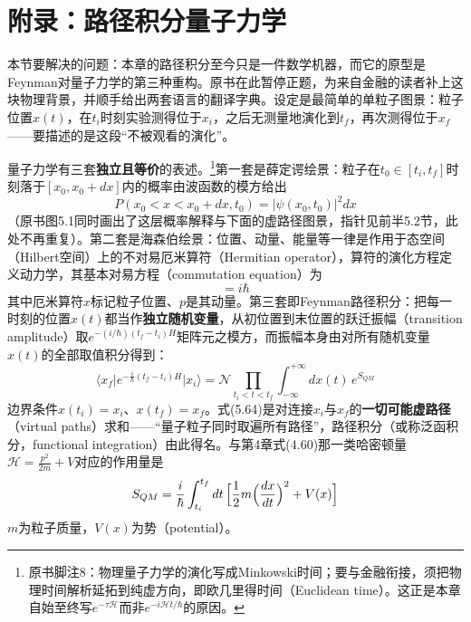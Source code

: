 \section{附录：路径积分量子力学}

本节要解决的问题：本章的路径积分至今只是一件数学机器，而它的原型是Feynman对量子力学的第三种重构。原书在此暂停正题，为来自金融的读者补上这块物理背景，并顺手给出两套语言的翻译字典。设定是最简单的单粒子图景：粒子位置$x(t)$，在$t_i$时刻实验测得位于$x_i$，之后无测量地演化到$t_f$，再次测得位于$x_f$——要描述的是这段“不被观看的演化”。

量子力学有三套\textbf{独立且等价}的表述。\footnote{原书脚注8：物理量子力学的演化写成Minkowski时间；要与金融衔接，须把物理时间解析延拓到纯虚方向，即欧几里得时间（Euclidean time）。这正是本章自始至终写$e^{-\tau\mathcal{H}}$而非$e^{-i\mathcal{H}t/\hbar}$的原因。}第一套是薛定谔绘景：粒子在$t_0\in[t_i,t_f]$时刻落于$[x_0,x_0+dx]$内的概率由波函数的模方给出
\begin{equation*}
P(x_0<x<x_0+dx,t_0)=\vert\psi(x_0,t_0)\vert^{2}dx
\end{equation*}
（原书图5.1同时画出了这层概率解释与下面的虚路径图景，指针见前半5.2节，此处不再重复）。第二套是海森伯绘景：位置、动量、能量等一律是作用于态空间（Hilbert空间）上的不对易厄米算符（Hermitian operator），算符的演化方程定义动力学，其基本对易方程（commutation equation）为
\begin{equation*}
[x,p]=i\hbar
\tag{5.63}
\end{equation*}
其中厄米算符$x$标记粒子位置、$p$是其动量。第三套即Feynman路径积分：把每一时刻的位置$x(t)$都当作\textbf{独立随机变量}，从初位置到末位置的跃迁振幅（transition amplitude）取$e^{-(i/\hbar)(t_f-t_i)H}$矩阵元之模方，而振幅本身由对所有随机变量$x(t)$的全部取值积分得到：
\begin{equation*}
\langle x_f\vert e^{-\frac{i}{\hbar}(t_f-t_i)H}\vert x_i\rangle
=\mathcal{N}\prod_{t_i<t<t_f}\int_{-\infty}^{+\infty}dx(t)\,e^{S_{QM}}
\tag{5.64}
\end{equation*}
边界条件$x(t_i)=x_i$、$x(t_f)=x_f$。式(5.64)是对连接$x_i$与$x_f$的\textbf{一切可能虚路径}（virtual paths）求和——“量子粒子同时取遍所有路径”，路径积分（或称泛函积分，functional integration）由此得名。与第4章式(4.60)那一类哈密顿量
$\mathcal{H}=\frac{p^2}{2m}+V$对应的作用量是
\begin{equation*}
S_{QM}=\frac{i}{\hbar}\int_{t_i}^{t_f}dt\,
\Bigl[\frac{1}{2}m\Bigl(\frac{dx}{dt}\Bigr)^{2}+V(x)\Bigr]
\end{equation*}
$m$为粒子质量，$V(x)$为势（potential）。

